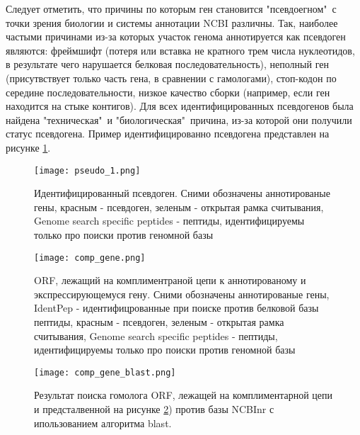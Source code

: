 Следует отметить, что причины по которым ген становится "псевдоегном"\ с точки зрения биологии и системы аннотации NCBI различны. Так, наиболее частыми причинами из-за которых участок генома аннотируется как псевдоген являются: фреймшифт (потеря или вставка не кратного трем числа нуклеотидов, в результате чего нарушается белковая последовательность), неполный ген (присутвствует только часть гена, в сравнении с гамологами), стоп-кодон по середине последовательности, низкое качество сборки (например, если ген находится на стыке контигов). Для всех идентифицированных псевдогенов была найдена "техническая"\ и "биологическая"\ причина, из-за которой они получили статус псевдогена. Пример идентифицированно псевдогена представлен на рисунке \ref{pseudo_1}.

\begin{figure}[ph!]
    \begin{center}
        \texttt{[image: pseudo\_1.png]}
    \end{center}
\caption[foo bar]{Идентифицированный псевдоген. Сними обозначены аннотированые гены, красным - псевдоген, зеленым - открытая рамка считывания, Genome search specific peptides - пептиды, идентифицируемы только про поиски против геномной базы}
\label{pseudo_1}
\end{figure}

\begin{figure}[ph!]
    \begin{center}
        \texttt{[image: comp\_gene.png]}
    \end{center}
\caption[foo bar]{ORF, лежащий на комплиментраной цепи к аннотированому и экспрессирующемуся гену. Сними обозначены аннотированые гены, IdentPep - идентифицрованные при поиске против белковой базы пептиды, красным - псевдоген, зеленым - открытая рамка считывания, Genome search specific peptides - пептиды, идентифицируемы только про поиски против геномной базы}
\label{comp_gene}
\end{figure}

\begin{figure}[ph!]
    \begin{center}
        \texttt{[image: comp\_gene\_blast.png]}
    \end{center}
\caption[foo bar]{Результат поиска гомолога ORF, лежащей на комплиментарной цепи и предсталвенной на рисунке \ref{comp_gene}) против базы NCBInr с ипользованием алгоритма blast.}
\label{comp_gene_blast}
\end{figure}


